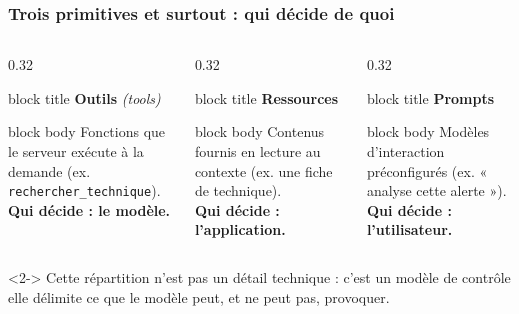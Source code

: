 \documentclass[aspectratio=169,11pt]{beamer}
\begin{document}
\begin{frame}
  \frametitle{Trois primitives et surtout : qui décide de quoi}
  \vspace{0.2cm}
  \begin{columns}[T]
    \begin{column}{0.32\textwidth}
      \begin{beamercolorbox}[rounded=true, sep=6pt]{block title}
        \centering\textbf{Outils} \emph{(tools)}
      \end{beamercolorbox}
      \begin{beamercolorbox}[rounded=true, sep=6pt]{block body}
        \small Fonctions que le serveur exécute à la demande
        (ex. \texttt{rechercher\_technique}).\\[4pt]
        \textbf{Qui décide : le modèle.}
      \end{beamercolorbox}
    \end{column}
    \begin{column}{0.32\textwidth}
      \begin{beamercolorbox}[rounded=true, sep=6pt]{block title}
        \centering\textbf{Ressources}
      \end{beamercolorbox}
      \begin{beamercolorbox}[rounded=true, sep=6pt]{block body}
        \small Contenus fournis en lecture au contexte
        (ex. une fiche de technique).\\[4pt]
        \textbf{Qui décide : l'application.}
      \end{beamercolorbox}
    \end{column}
    \begin{column}{0.32\textwidth}
      \begin{beamercolorbox}[rounded=true, sep=6pt]{block title}
        \centering\textbf{Prompts}
      \end{beamercolorbox}
      \begin{beamercolorbox}[rounded=true, sep=6pt]{block body}
        \small Modèles d'interaction préconfigurés
        (ex. « analyse cette alerte »).\\[4pt]
        \textbf{Qui décide : l'utilisateur.}
      \end{beamercolorbox}
    \end{column}
  \end{columns}
  \vspace{0.4cm}
  \begin{exampleblock}{ }<2->
    Cette répartition n'est pas un détail technique : c'est un modèle de
    contrôle  elle délimite ce que le modèle peut, et ne peut pas, provoquer.
  \end{exampleblock}
\end{frame}
 
\end{document}
